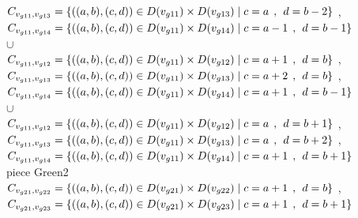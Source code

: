 \\$C_{v_{g11},v_{g13}}=\{((a,b),(c,d))\in D(v_{g11}) \times D(v_{g13})\mid c = a  \hspace{1ex} , \hspace{1ex}  d = b - 2 \}$ , 
\\$C_{v_{g11},v_{g14}}=\{((a,b),(c,d))\in D(v_{g11}) \times D(v_{g14})\mid c = a - 1\hspace{1ex} , \hspace{1ex}  d = b - 1 \}$ 
\\$\cup$
\\$C_{v_{g11},v_{g12}}=\{((a,b),(c,d))\in D(v_{g11}) \times D(v_{g12})\mid c = a + 1\hspace{1ex} , \hspace{1ex}  d = b   \}$ , 
\\$C_{v_{g11},v_{g13}}=\{((a,b),(c,d))\in D(v_{g11}) \times D(v_{g13})\mid c = a + 2\hspace{1ex} , \hspace{1ex}  d = b   \}$ , 
\\$C_{v_{g11},v_{g14}}=\{((a,b),(c,d))\in D(v_{g11}) \times D(v_{g14})\mid c = a + 1\hspace{1ex} , \hspace{1ex}  d = b - 1 \}$  
\\$\cup$
\\$C_{v_{g11},v_{g12}}=\{((a,b),(c,d))\in D(v_{g11}) \times D(v_{g12})\mid c = a   \hspace{1ex} , \hspace{1ex}  d = b + 1 \}$ , 
\\$C_{v_{g11},v_{g13}}=\{((a,b),(c,d))\in D(v_{g11}) \times D(v_{g13})\mid c = a   \hspace{1ex} , \hspace{1ex}  d = b + 2 \}$ , 
\\$C_{v_{g11},v_{g14}}=\{((a,b),(c,d))\in D(v_{g11}) \times D(v_{g14})\mid c = a + 1\hspace{1ex} , \hspace{1ex}  d = b + 1 \}$  
\\ piece Green2 
\\$C_{v_{g21},v_{g22}}=\{((a,b),(c,d))\in D(v_{g21}) \times D(v_{g22})\mid c = a + 1\hspace{1ex} , \hspace{1ex}  d = b    \}$ , 
\\$C_{v_{g21},v_{g23}}=\{((a,b),(c,d))\in D(v_{g21}) \times D(v_{g23})\mid c = a + 1\hspace{1ex} , \hspace{1ex}  d = b + 1 \}$  
